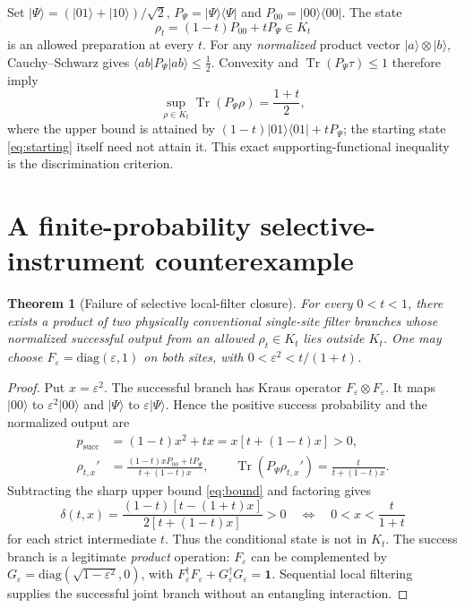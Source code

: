 \documentclass[10pt,letterpaper]{article}
\newtheorem{theorem}{Theorem}
\newcommand{\Tr}{\operatorname{Tr}}
\newcommand{\I}{\mathbf 1}
\begin{document}
Set $|\Psi\rangle=(|01\rangle+|10\rangle)/\sqrt{2}$, $P_\Psi=|\Psi\rangle\langle\Psi|$ and $P_{00}=|00\rangle\langle00|$. The state
\begin{equation}\label{eq:starting}
\rho_t=(1-t)P_{00}+tP_\Psi\in K_t
\end{equation}
is an allowed preparation at every $t$. For any \emph{normalized} product vector $|a\rangle\otimes|b\rangle$, Cauchy--Schwarz gives $\langle ab|P_\Psi|ab\rangle\leq\tfrac12$. Convexity and $\Tr(P_\Psi\tau)\leq 1$ therefore imply
\begin{equation}\label{eq:bound}
\sup_{\rho\in K_t}\Tr(P_\Psi\rho)=\frac{1+t}{2},
\end{equation}
where the upper bound is attained by $(1-t)|01\rangle\langle01|+tP_\Psi$; the starting state \eqref{eq:starting} itself need not attain it. This exact supporting-functional inequality is the discrimination criterion.

\section{A finite-probability selective-instrument counterexample}
\begin{theorem}[Failure of selective local-filter closure]\label{thm:filter}
For every $0<t<1$, there exists a product of two physically conventional single-site filter branches whose normalized successful output from an allowed $\rho_t\in K_t$ lies outside $K_t$. One may choose $F_\varepsilon=\mathrm{diag}(\varepsilon,1)$ on both sites, with $0<\varepsilon^2<t/(1+t)$.
\end{theorem}
\begin{proof}
Put $x=\varepsilon^2$. The successful branch has Kraus operator $F_\varepsilon\otimes F_\varepsilon$. It maps $|00\rangle$ to $\varepsilon^2|00\rangle$ and $|\Psi\rangle$ to $\varepsilon|\Psi\rangle$. Hence the positive success probability and the normalized output are
\begin{align}\label{eq:success}
p_{\mathrm{succ}}&=(1-t)x^2+tx=x[t+(1-t)x]>0,\\
\rho_{t,x}'&=\frac{(1-t)xP_{00}+tP_\Psi}{t+(1-t)x},\qquad
\Tr(P_\Psi\rho_{t,x}')=\frac{t}{t+(1-t)x}.
\end{align}
Subtracting the sharp upper bound \eqref{eq:bound} and factoring gives
\begin{equation}\label{eq:gap}
\delta(t,x)=\frac{(1-t)[t-(1+t)x]}{2[t+(1-t)x]}>0
\quad\Longleftrightarrow\quad 0<x<\frac{t}{1+t}
\end{equation}
for each strict intermediate $t$. Thus the conditional state is not in $K_t$. The success branch is a legitimate \emph{product} operation: $F_\varepsilon$ can be complemented by $G_\varepsilon=\mathrm{diag}(\sqrt{1-\varepsilon^2},0)$, with $F_\varepsilon^\dagger F_\varepsilon+G_\varepsilon^\dagger G_\varepsilon=\I$. Sequential local filtering supplies the successful joint branch without an entangling interaction.
\end{proof}
\end{document}
